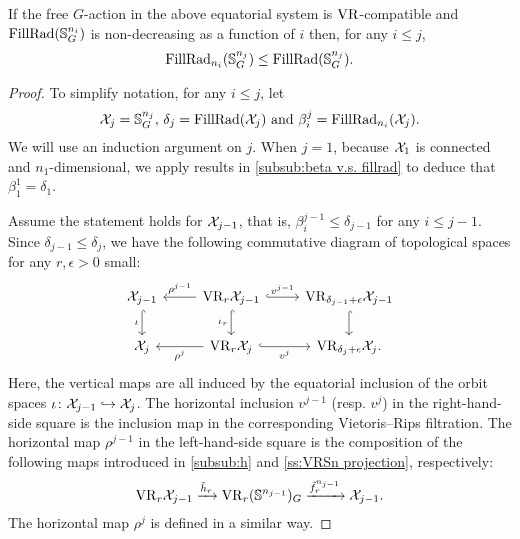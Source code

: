 \medskip\lemma If the free \(G\)-action in the above equatorial system is \(\mathrm{VR}\)-compatible and $\operatorname{FillRad}(\mathbb{S}^{n_i}_G)$ is non-decreasing as a function of \(i\) then, for any \(i \leq j\),
\[
\operatorname{FillRad}_{n_i}(\mathbb{S}^{n_j}_G) \leq \operatorname{FillRad}(\mathbb{S}^{n_j}_G).
\]

\begin{proof}
    To simplify notation, for any $i \leq j$, let
    \[
        \mathcal{X}_j = \mathbb{S}^{n_j}_G, \,\delta_j = \operatorname{FillRad}(\mathcal{X}_j) \text{ and }\beta_i^j = \operatorname{FillRad}_{n_i}(\mathcal{X}_j).
    \]
	We will use an induction argument on $j$.
	When $j = 1$, because $\mathcal{X}_1$ is connected and $n_1$-dimensional, we apply results in \cref{subsub:beta v.s. fillrad} to deduce that $\beta_1^1 = \delta_1$.

	Assume the statement holds for $\mathcal{X}_{j-1}$, that is, $\beta_i^{j-1} \leq \delta_{j-1}$ for any $i \leq j-1$.
	Since $\delta_{j-1} \leq \delta_j$, we have the following commutative diagram of topological spaces for any $r,\epsilon>0$ small:
    \begin{equation}\label{d:fundamental_bars_diagram}
        \begin{tikzcd}
            \cX_{j-1}
            \ar[d, hook,"{\iota}" left]
            &
            \VR_r\cX_{j-1}
            \ar[d, hook,"\iota_r" left]
            \ar[l, "\rho^{j-1}" above]
            \ar[r, hook, "v^{j-1}"]
            &
            \VR_{\delta_{j-1}+\epsilon}\cX_{j-1}
            \ar[d, hook]
            \\
            \cX_j
            &
            \VR_r\cX_j
            \ar[l, "\rho^j" below]
            \ar[r, hook, "v^j" below]
            &
            \VR_{\delta_j+\epsilon}\cX_j.
        \end{tikzcd}
    \end{equation}
    Here, the vertical maps are all induced by the equatorial inclusion of the orbit spaces $\iota \colon \mathcal{X}_{j-1} \hookrightarrow \mathcal{X}_j$.
    The horizontal inclusion $v^{j-1}$ (resp. $v^j$) in the right-hand-side square is the inclusion map in the corresponding Vietoris--Rips filtration.
    The horizontal map $\rho^{j-1}$ in the left-hand-side square is the composition of the following maps introduced in \cref{subsub:h} and \cref{ss:VRSn projection}, respectively:
    \[\mathrm{VR}_r\mathcal{X}_{j-1} \xrightarrow{\tilde{h}_r}\mathrm{VR}_r(\mathbb{S}^{n_{j-1}})_G \xrightarrow{\tilde{f}_r^{n_{j-1}}} \mathcal{X}_{j-1}.\]
    The horizontal map $\rho^j$ is defined in a similar way.


\end{proof}
